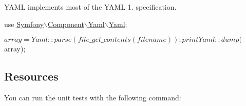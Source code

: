 Y\+A\+ML implements most of the Y\+A\+ML 1. specification.


\begin{DoxyCode}
use \hyperlink{namespace_symfony_1_1_component_1_1_yaml_1_1_yaml}{Symfony\(\backslash\)Component\(\backslash\)Yaml\(\backslash\)Yaml};

$array = Yaml::parse(file\_get\_contents(filename));

print Yaml::dump($array);
\end{DoxyCode}


\subsection*{Resources }

You can run the unit tests with the following command\+: 
 